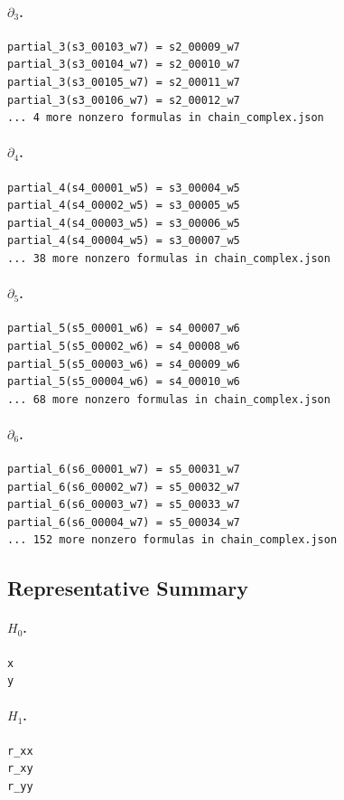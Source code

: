 \documentclass[11pt]{article}
\begin{document}
\paragraph{\(\partial_3\).}
\begin{verbatim}
partial_3(s3_00103_w7) = s2_00009_w7
partial_3(s3_00104_w7) = s2_00010_w7
partial_3(s3_00105_w7) = s2_00011_w7
partial_3(s3_00106_w7) = s2_00012_w7
... 4 more nonzero formulas in chain_complex.json
\end{verbatim}
\paragraph{\(\partial_4\).}
\begin{verbatim}
partial_4(s4_00001_w5) = s3_00004_w5
partial_4(s4_00002_w5) = s3_00005_w5
partial_4(s4_00003_w5) = s3_00006_w5
partial_4(s4_00004_w5) = s3_00007_w5
... 38 more nonzero formulas in chain_complex.json
\end{verbatim}
\paragraph{\(\partial_5\).}
\begin{verbatim}
partial_5(s5_00001_w6) = s4_00007_w6
partial_5(s5_00002_w6) = s4_00008_w6
partial_5(s5_00003_w6) = s4_00009_w6
partial_5(s5_00004_w6) = s4_00010_w6
... 68 more nonzero formulas in chain_complex.json
\end{verbatim}
\paragraph{\(\partial_6\).}
\begin{verbatim}
partial_6(s6_00001_w7) = s5_00031_w7
partial_6(s6_00002_w7) = s5_00032_w7
partial_6(s6_00003_w7) = s5_00033_w7
partial_6(s6_00004_w7) = s5_00034_w7
... 152 more nonzero formulas in chain_complex.json
\end{verbatim}

\subsection{Representative Summary}
\paragraph{\(H_0\).}
\begin{verbatim}
x
y
\end{verbatim}
\paragraph{\(H_1\).}
\begin{verbatim}
r_xx
r_xy
r_yy
\end{verbatim}
\end{document}
